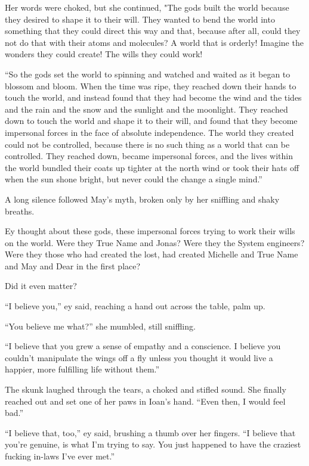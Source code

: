 Her words were choked, but she continued, "The gods built the world because they desired to shape it to their will. They wanted to bend the world into something that they could direct this way and that, because after all, could they not do that with their atoms and molecules? A world that is orderly! Imagine the wonders they could create! The wills they could work!

``So the gods set the world to spinning and watched and waited as it began to blossom and bloom. When the time was ripe, they reached down their hands to touch the world, and instead found that they had become the wind and the tides and the rain and the snow and the sunlight and the moonlight. They reached down to touch the world and shape it to their will, and found that they become impersonal forces in the face of absolute independence. The world they created could not be controlled, because there is no such thing as a world that can be controlled. They reached down, became impersonal forces, and the lives within the world bundled their coats up tighter at the north wind or took their hats off when the sun shone bright, but never could the change a single mind.''

A long silence followed May's myth, broken only by her sniffling and shaky breaths.

Ey thought about these gods, these impersonal forces trying to work their wills on the world. Were they True Name and Jonas? Were they the System engineers? Were they those who had created the lost, had created Michelle and True Name and May and Dear in the first place?

Did it even matter?

``I believe you,'' ey said, reaching a hand out across the table, palm up.

``You believe me what?'' she mumbled, still sniffling.

``I believe that you grew a sense of empathy and a conscience. I believe you couldn't manipulate the wings off a fly unless you thought it would live a happier, more fulfilling life without them.''

The skunk laughed through the tears, a choked and stifled sound. She finally reached out and set one of her paws in Ioan's hand. ``Even then, I would feel bad.''

``I believe that, too,'' ey said, brushing a thumb over her fingers. ``I believe that you're genuine, is what I'm trying to say. You just happened to have the craziest fucking in-laws I've ever met.''

